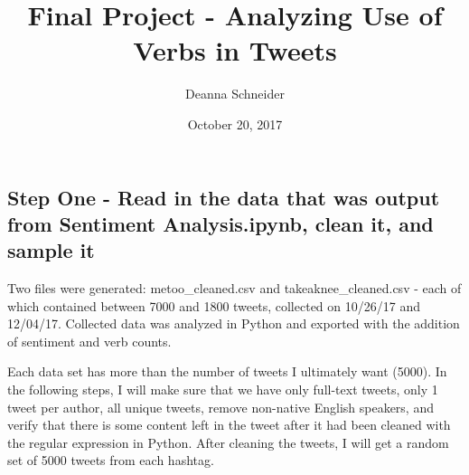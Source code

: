 \documentclass[]{article}
\title{Final Project - Analyzing Use of Verbs in Tweets}
\author{Deanna Schneider}
\date{October 20, 2017}
\begin{document}
\maketitle

\subsection{Step One - Read in the data that was output from Sentiment
Analysis.ipynb, clean it, and sample
it}\label{step-one---read-in-the-data-that-was-output-from-sentiment-analysis.ipynb-clean-it-and-sample-it}

Two files were generated: metoo\_cleaned.csv and takeaknee\_cleaned.csv
- each of which contained between 7000 and 1800 tweets, collected on
10/26/17 and 12/04/17. Collected data was analyzed in Python and
exported with the addition of sentiment and verb counts.

Each data set has more than the number of tweets I ultimately want
(5000). In the following steps, I will make sure that we have only
full-text tweets, only 1 tweet per author, all unique tweets, remove
non-native English speakers, and verify that there is some content left
in the tweet after it had been cleaned with the regular expression in
Python. After cleaning the tweets, I will get a random set of 5000
tweets from each hashtag.
\end{document}
